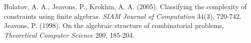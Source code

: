 \documentclass{amsart}
\theoremstyle{plain}
\theoremstyle{definition}
\theoremstyle{remark}
\begin{document}
\begin{thebibliography}{9}
    Bulatov, A. A.,  Jeavons, P., Krokhin, A. A. (2005). Classifying the complexity of constraints using finite algebras. \emph{SIAM Journal of Computation} 34(3), 720-742.
    Jeavons, P. (1998). On the algebraic structure of combinatorial problems, \emph{Theoretical Computer Science} 200, 185-204.
 \end{thebibliography}
\end{document}
